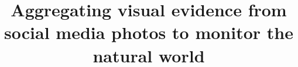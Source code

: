 \documentclass{sig-alternate-05-2015}
\begin{document}


\title{Aggregating visual evidence from social media photos to monitor the natural world}

%
%
%
%
%
\end{document}
